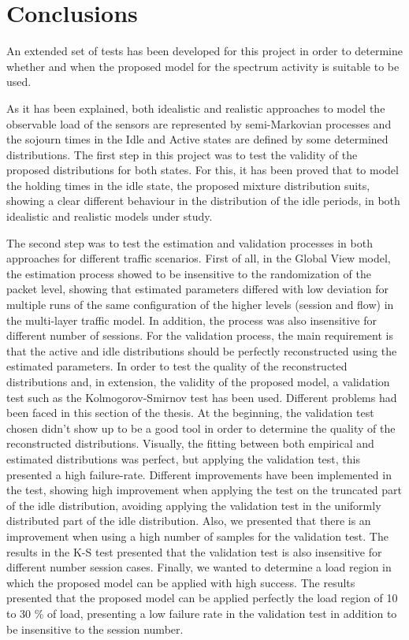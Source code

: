 \chapter{Conclusions} \label{chapter:conclusions}

An extended set of tests has been developed for this project in order to determine whether and when the proposed model for the spectrum activity is suitable to be used.

As it has been explained, both idealistic and realistic approaches to model the observable load of the sensors are represented by semi-Markovian processes and the sojourn times in the Idle and Active states are defined by some determined distributions. The first step in this project was to test the validity of the proposed distributions for both states. For this, it has been proved that to model the holding times in the idle state, the proposed mixture distribution suits, showing a clear different behaviour in the distribution of the idle periods, in both idealistic and realistic models under study.

The second step was to test the estimation and validation processes in both approaches for different traffic scenarios. First of all, in the Global View model, the estimation process showed to be insensitive to the randomization of the packet level, showing that estimated parameters differed with low deviation for multiple runs of the same configuration of the higher levels (session and flow) in the multi-layer traffic model. In addition, the process was also insensitive for different number of sessions. For the validation process, the main requirement is that the active and idle distributions should be perfectly reconstructed using the estimated parameters. In order to test the quality of the reconstructed distributions and, in extension, the validity of the proposed model, a validation test such as the Kolmogorov-Smirnov test has been used. Different problems had been faced in this section of the thesis. At the beginning, the validation test chosen didn't show up to be a good tool in order to determine the quality of the reconstructed distributions. Visually, the fitting between both empirical and estimated distributions was perfect, but applying the validation test, this presented a high failure-rate. Different improvements have been implemented in the test, showing high improvement when applying the test on the truncated part of the idle distribution, avoiding applying the validation test in the uniformly distributed part of the idle distribution. Also, we presented that there is an improvement when using a high number of samples for the validation test. The results in the \acs{K-S} test presented that the validation test is also insensitive for different number session cases. Finally, we wanted to determine a load region in which the proposed model can be applied with high success. The results presented that the proposed model can be applied perfectly the load region of 10 to 30 \% of load, presenting a low failure rate in the validation test in addition to be insensitive to the session number.

